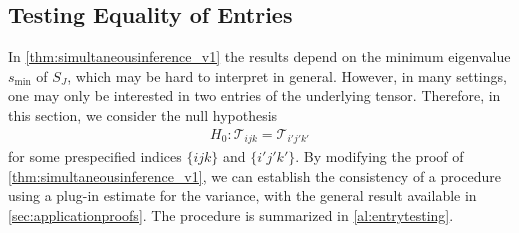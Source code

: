 \documentclass[10pt]{article}
\newcommand{\0}{{\mathbf{0}}}
\newcommand{\1}{{\mathbf{1}}}
\begin{document}


\subsection{Testing Equality of Entries} 
\label{sec:testing2}
In \cref{thm:simultaneousinference_v1} the results depend on the minimum eigenvalue $s_{\min}$ of $S_J$, which may be hard to interpret in general.  However, in many settings, one may only be interested in two entries of the underlying tensor.  Therefore, in this section, we consider the null hypothesis
\begin{align*}
    H_0: \mathcal{T}_{ijk} = \mathcal{T}_{i'j'k'}
\end{align*}
for some prespecified indices $\{ijk\}$ and $\{i'j'k'\}$.  By modifying the proof of \cref{thm:simultaneousinference_v1}, we can establish the  consistency of a procedure using a plug-in estimate for the variance, with the general result available in \cref{sec:applicationproofs}.   The procedure is summarized in \cref{al:entrytesting}.
\end{document}
